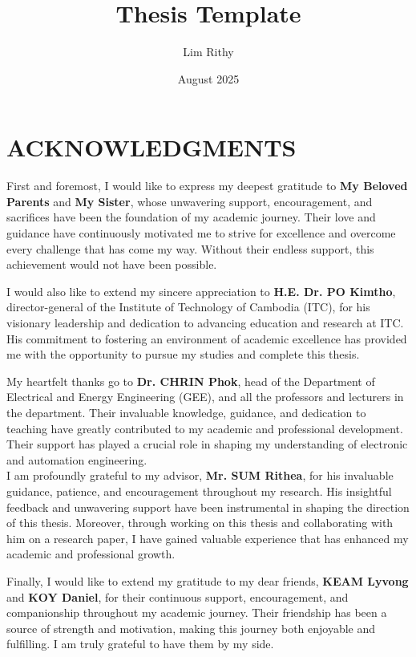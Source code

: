 \documentclass{rithy-thesis}
\title{Thesis Template}
\author{Lim Rithy}
\date{August 2025}
\begin{document}
\chapter*{ACKNOWLEDGMENTS}

First and foremost, I would like to express my deepest gratitude to \textbf{My Beloved Parents} and \textbf{My Sister}, whose unwavering support, encouragement, and sacrifices have been the foundation of my academic journey. Their love and guidance have continuously motivated me to strive for excellence and overcome every challenge that has come my way. Without their endless support, this achievement would not have been possible.\newline

I would also like to extend my sincere appreciation to \textbf{H.E. Dr. PO Kimtho}, director-general of the Institute of Technology of Cambodia (ITC), for his visionary leadership and dedication to advancing education and research at ITC. His commitment to fostering an environment of academic excellence has provided me with the opportunity to pursue my studies and complete this thesis.\newline

My heartfelt thanks go to \textbf{Dr. CHRIN Phok}, head of the Department of Electrical and Energy Engineering (GEE), and all the professors and lecturers in the department. Their invaluable knowledge, guidance, and dedication to teaching have greatly contributed to my academic and professional development. Their support has played a crucial role in shaping my understanding of electronic and automation engineering.\\

I am profoundly grateful to my advisor, \textbf{Mr. SUM Rithea}, for his invaluable guidance, patience, and encouragement throughout my research. His insightful feedback and unwavering support have been instrumental in shaping the direction of this thesis. Moreover, through working on this thesis and collaborating with him on a research paper, I have gained valuable experience that has enhanced my academic and professional growth.\newline

Finally, I would like to extend my gratitude to my dear friends, \textbf{KEAM Lyvong} and \textbf{KOY Daniel}, for their continuous support, encouragement, and companionship throughout my academic journey. Their friendship has been a source of strength and motivation, making this journey both enjoyable and fulfilling. I am truly grateful to have them by my side.
\end{document}
